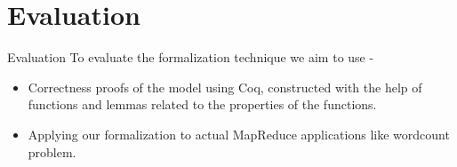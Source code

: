 \section{Evaluation}

\begin{frame}{Evaluation}
To evaluate the formalization technique we aim to use -
\begin{itemize}
	\item Correctness proofs of the model using Coq, constructed with the help of functions and lemmas related to the properties of the functions.
	\item Applying our formalization to actual MapReduce applications like wordcount problem.
\end{itemize}
\end{frame}
